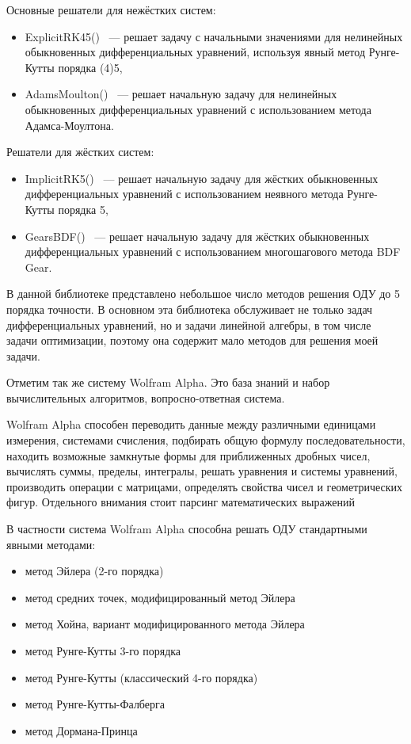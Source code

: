 Основные решатели для нежёстких систем:
\begin{itemize}
    \item ExplicitRK45() ~--- решает задачу с начальными значениями для нелинейных обыкновенных дифференциальных уравнений, используя
        явный метод Рунге-Кутты порядка (4)5,
    \item AdamsMoulton() ~--- решает начальную задачу для нелинейных обыкновенных дифференциальных уравнений с использованием метода
        Адамса-Моултона.
\end{itemize}

Решатели для жёстких систем:
\begin{itemize}
    \item ImplicitRK5() ~--- решает начальную задачу для жёстких обыкновенных дифференциальных уравнений с использованием неявного
        метода Рунге-Кутты порядка 5,
    \item GearsBDF() ~--- решает начальную задачу для жёстких обыкновенных дифференциальных уравнений с использованием многошагового
        метода BDF Gear.
\end{itemize}

В данной библиотеке представлено небольшое число методов решения ОДУ до 5 порядка точности. В основном эта библиотека обслуживает
не только задач дифференциальных уравнений, но и задачи линейной алгебры, в том числе задачи оптимизации, поэтому она содержит мало методов
для решения моей задачи.

Отметим так же систему Wolfram Alpha. Это база знаний и набор вычислительных алгоритмов, вопросно-ответная
система.

Wolfram Alpha способен переводить данные между различными единицами
измерения, системами счисления, подбирать общую формулу последовательности, находить возможные замкнутые формы для приближенных
дробных чисел, вычислять суммы, пределы, интегралы, решать уравнения и системы уравнений, производить операции с матрицами, определять
свойства чисел и геометрических фигур. Отдельного внимания стоит парсинг математических выражений

В частности система Wolfram Alpha способна решать ОДУ стандартными явными методами:
\begin{itemize}
    \item метод Эйлера (2-го порядка)
    \item метод средних точек, модифицированный метод Эйлера
    \item метод Хойна, вариант модифицированного метода Эйлера
    \item метод Рунге-Кутты 3-го порядка
    \item метод Рунге-Кутты (классический 4-го порядка)
    \item метод Рунге-Кутты-Фалберга
    \item метод Дормана-Принца
\end{itemize}

